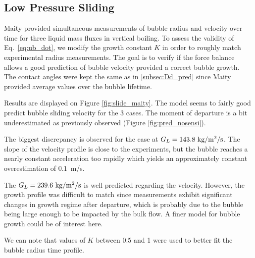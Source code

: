 \subsection{Low Pressure Sliding}

Maity \cite{maity_effect_2000} provided simultaneous measurements of bubble radius and velocity over time for three liquid mass fluxes in vertical boiling. To assess the validity of Eq.~\ref{eq:ub_dot}, we modify the growth constant $K$ in order to roughly match experimental radius measurements. The goal is to verify if the force balance allows a good prediction of bubble velocity provided a correct bubble growth. The contact angles were kept the same as in \ref{subsec:Dd_pred} since Maity provided average values over the bubble lifetime.

Results are displayed on Figure \ref{fig:slide_maity}. The model seems to fairly good predict bubble sliding velocity for the 3 cases. The moment of departure is a bit underestimated as previously observed (Figure \ref{fig:pred_nosensi}).

The biggest discrepancy is observed for the case at $G_{L}=143.8~ \text{kg/m$^{2}$/s}$. The slope of the velocity profile is close to the experiments, but the bubble reaches a nearly constant acceleration too rapidly which yields an approximately constant overestimation of $0.1$~m/s.

The $G_{L}=239.6~ \text{kg/m$^{2}$/s}$ is well predicted regarding the velocity. However, the growth profile was difficult to match since measurements exhibit significant changes in growth regime after departure, which is probably due to the bubble being large enough to be impacted by the bulk flow. A finer model for bubble growth could be of interest here.


We can note that values of $K$ between 0.5 and 1 were used to better fit the bubble radius time profile.




